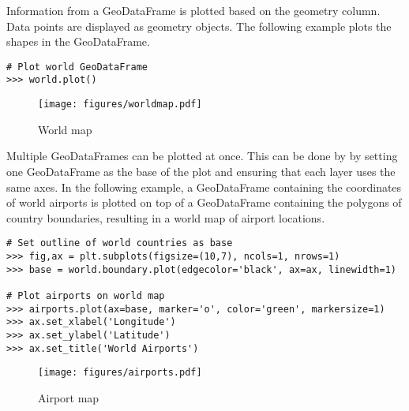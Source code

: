 Information from a GeoDataFrame is plotted based on the geometry column.
Data points are displayed as geometry objects.
The following example plots the shapes in the  GeoDataFrame.

\begin{lstlisting}
# Plot world GeoDataFrame
>>> world.plot()
\end{lstlisting}

\begin{figure}[H]
\begin{center}
\texttt{[image: figures/worldmap.pdf]}
\end{center}
\label{world-map}
\caption{World map}
\end{figure}

Multiple GeoDataFrames can be plotted at once.
This can be done by by setting one GeoDataFrame as the base of the plot and ensuring that each layer uses the same axes.
In the following example, a GeoDataFrame containing the coordinates of world airports is plotted on top of a GeoDataFrame containing the polygons of country boundaries, resulting in a world map of airport locations.

\begin{lstlisting}
# Set outline of world countries as base
>>> fig,ax = plt.subplots(figsize=(10,7), ncols=1, nrows=1)
>>> base = world.boundary.plot(edgecolor='black', ax=ax, linewidth=1)

# Plot airports on world map
>>> airports.plot(ax=base, marker='o', color='green', markersize=1)
>>> ax.set_xlabel('Longitude')
>>> ax.set_ylabel('Latitude')
>>> ax.set_title('World Airports')
\end{lstlisting}

\begin{figure}[H]
\begin{center}
\texttt{[image: figures/airports.pdf]}
\end{center}
\label{airport-map}
\caption{Airport map}
\end{figure}


